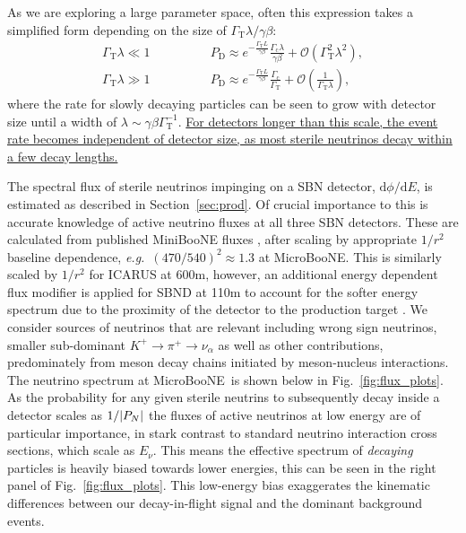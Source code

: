 \documentclass[11pt, a4paper]{article}
\newcommand{\reffig}[1]{Fig.~\ref{#1}}
\newcommand{\refsec}[1]{Section~\ref{#1}}
\def\eg{\emph{e.g.}}
\def\muboone{MicroBooNE}
\def\ster{\ensuremath N}
\newcommand{\newtext}[2]{\textcolor{#1}{\ul{#2}}}
\begin{document}
As we are exploring a large parameter space, often this expression takes a
simplified form depending on the size of $\Gamma_\text{T}\lambda/\gamma\beta$:
%
\begin{align} 
%
\Gamma_\text{T}\lambda \ll 1\qquad&\qquad P_\text{D} \approx
e^{-\frac{\Gamma_\text{T}L}{\gamma\beta}}\frac{\Gamma_\text{c}\lambda}{\gamma\beta}
+ \mathcal{O}\left(\Gamma_\text{T}^2\lambda^2\right),\label{eq:prob_dec1}\\
%
\Gamma_\text{T}\lambda \gg 1\qquad&\qquad P_\text{D} \approx
e^{-\frac{\Gamma_\text{T}L}{\gamma\beta}}\frac{\Gamma_\text{c}}{\Gamma_\text{T}}
+ \mathcal{O}\left(\frac{1}{\Gamma_\text{T}\lambda}\right),
\label{eq:prob_dec2}
%
\end{align}
%
where the rate for slowly decaying particles can be seen to grow with detector
size until a width of $\lambda\sim\gamma\beta\Gamma_\text{T}^{-1}$.
\newtext{PB}{For detectors longer than this scale, the event rate becomes
independent of detector size, as most sterile neutrinos decay within a few
decay lengths.} 

The spectral flux of sterile neutrinos impinging on a SBN detector,
$\mathrm{d}\phi/\mathrm{d}E$, is estimated as described in \refsec{sec:prod}.
Of crucial importance to this is accurate knowledge of active neutrino fluxes
at all three SBN detectors. These are calculated from published MiniBooNE
fluxes \cite{AguilarArevalo:2008yp}, after scaling by appropriate $1/r^2$
baseline dependence, \eg\ $(470/540)^2 \approx 1.3$ at \muboone. This is
similarly scaled by $1/r^2$ for ICARUS at 600m, however, an additional energy
dependent flux modifier is applied for SBND at 110m to account for the softer
energy spectrum due to the proximity of the detector to the production target
\cite{Antonello:2015lea}. We consider sources of neutrinos that are relevant
including wrong sign neutrinos, smaller sub-dominant $K^+\rightarrow
\pi^+\rightarrow \nu_\alpha$ as well as other contributions, predominately from
meson decay chains initiated by meson-nucleus interactions. The neutrino
spectrum at \muboone\ is shown below in \reffig{fig:flux_plots}. As the
probability for any given sterile neutrins to subsequently decay inside a detector
scales as $1/|P_{\ster}|$ the fluxes of active neutrinos at low
energy are of particular importance, in stark contrast to standard neutrino
interaction cross sections, which scale as $E_\nu$. 
%
This means the effective spectrum of \emph{decaying} particles is heavily biased
towards lower energies, this can be seen in the right panel of
\reffig{fig:flux_plots}.
%
This low-energy bias exaggerates the kinematic differences between our
decay-in-flight signal and the dominant background events. 
\end{document}
